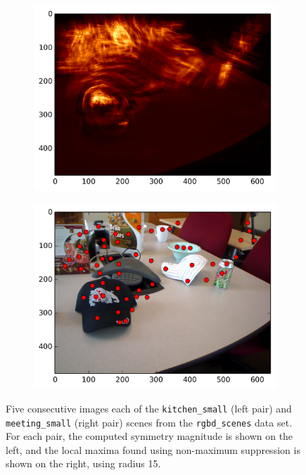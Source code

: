 \begin{figure}[ht]
\begin{subfigure}[]{0.25\linewidth}\label{fig:meet_smag_4}\includegraphics[width=\linewidth]{figures/meeting_smag_9}\end{subfigure}%
\begin{subfigure}[]{0.25\linewidth}\label{fig:meet_feats_4}\includegraphics[width=\linewidth]{figures/meeting_feats_9}\end{subfigure}
\caption[Five consecutive images of two scenes from the \texttt{rgbd\_scenes} data set.]{Five consecutive images each of the \texttt{kitchen\_small} (left pair) and \texttt{meeting\_small} (right pair) scenes from the \texttt{rgbd\_scenes} data set\cite{henry_rgb-d_2012}. For each pair, the computed symmetry magnitude is shown on the left, and the local maxima found using non-maximum suppression is shown on the right, using radius 15.}
\label{fig:ex_xforms}
\end{figure}

